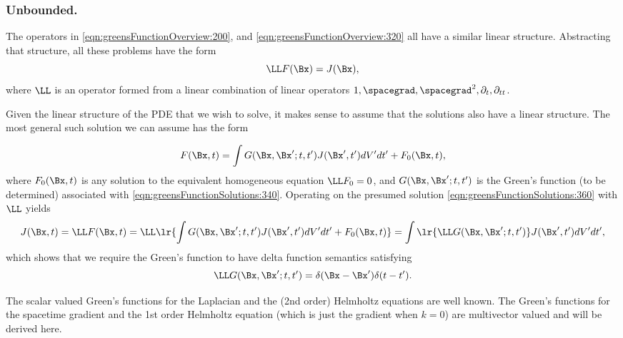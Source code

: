 %
%
\subsubsection{Unbounded.}

The operators in \cref{eqn:greensFunctionOverview:200}, and \cref{eqn:greensFunctionOverview:320} all have a similar linear structure.
Abstracting that structure, all these problems have the form
\begin{equation}\label{eqn:greensFunctionSolutions:340}
\LL F(\Bx) = J(\Bx),
\end{equation}
where \( \LL \) is an operator formed from a linear combination of linear operators \( 1, \spacegrad, \spacegrad^2, \partial_t, \partial_{tt} \).

Given the linear structure of the PDE that we wish to solve, it makes sense to assume that the solutions also have a linear structure.
The most general such solution we can assume has the form

\begin{equation}\label{eqn:greensFunctionSolutions:360}
F(\Bx, t) = \int G(\Bx, \Bx' ; t, t') J(\Bx', t') dV' dt' + F_0(\Bx, t),
\end{equation}
where \( F_0(\Bx, t) \) is any solution to the equivalent homogeneous equation \( \LL F_0 = 0 \), and \( G(\Bx, \Bx' ; t, t') \) is the Green's function (to be determined) associated with \cref{eqn:greensFunctionSolutions:340}.
Operating on the presumed solution
\cref{eqn:greensFunctionSolutions:360} with \( \LL \) yields
\begin{dmath}\label{eqn:greensFunctionSolutions:380}
J(\Bx, t) = \LL F(\Bx, t) = \LL\lr{
\int G(\Bx, \Bx' ; t, t') J(\Bx', t') dV' dt' + F_0(\Bx, t) }
=
\int \lr{ \LL G(\Bx, \Bx'; t, t') } J(\Bx', t') dV' dt',
\end{dmath}
which shows that we require the Green's function to have delta function semantics satisfying
\begin{equation}\label{eqn:greensFunctionSolutions:400}
\LL G(\Bx, \Bx' ; t, t') = \delta(\Bx - \Bx') \delta(t - t').
\end{equation}

The scalar valued Green's functions for the Laplacian and the (2nd order) Helmholtz equations are well known.
The Green's functions for the spacetime gradient and the 1st order Helmholtz equation (which is just the gradient when \( k = 0 \)) are multivector valued and will be derived here.

